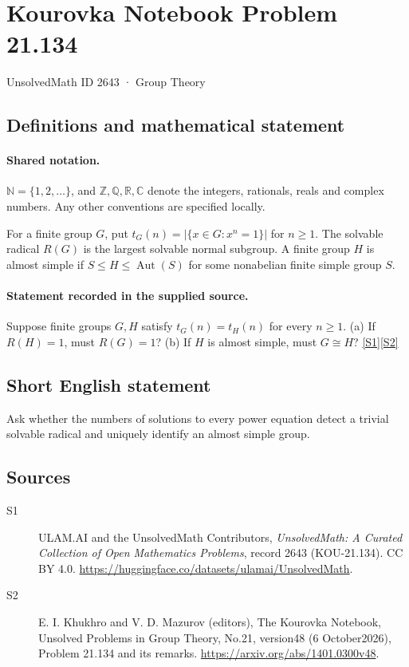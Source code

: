 \documentclass[11pt]{article}
\newcommand{\sref}[2]{\hyperlink{source:#1:#2}{[S#2]}}
\begin{document}
\setcounter{section}{2642}
\section{Kourovka Notebook Problem 21.134}\label{2643}
{\small\sffamily UnsolvedMath ID 2643 · Group Theory}
\subsection{Definitions and mathematical statement}

\paragraph{Shared notation.}$\mathbb N=\{1,2,\ldots\}$, and $\mathbb Z,\mathbb Q,\mathbb R,\mathbb C$ denote the integers, rationals, reals and complex numbers. Any other conventions are specified locally.


For a finite group $G$, put $t_G(n)=|\{x\in G:x^n=1\}|$ for $n\geq1$. The solvable radical $R(G)$ is the largest solvable normal subgroup. A finite group $H$ is almost simple if $S\leq H\leq\operatorname{Aut}(S)$ for some nonabelian finite simple group $S$.
\paragraph{Statement recorded in the supplied source.}
Suppose finite groups $G,H$ satisfy $t_G(n)=t_H(n)$ for every $n\geq1$. (a) If $R(H)=1$, must $R(G)=1$? (b) If $H$ is almost simple, must $G\cong H$? \sref{2643}{1}\sref{2643}{2}
\subsection{Short English statement}
Ask whether the numbers of solutions to every power equation detect a trivial solvable radical and uniquely identify an almost simple group.
\subsection{Sources}
\begin{description}
\item[\hypertarget{source:2643:1}{S1}] ULAM.AI and the UnsolvedMath Contributors, \emph{UnsolvedMath: A Curated Collection of Open Mathematics Problems}, record 2643 (KOU-21.134). CC BY 4.0. \url{https://huggingface.co/datasets/ulamai/UnsolvedMath}.
\item[\hypertarget{source:2643:2}{S2}] E. I. Khukhro and V. D. Mazurov (editors), The Kourovka Notebook, Unsolved Problems in Group Theory, No.21, version48 (6 October2026), Problem 21.134 and its remarks. \url{https://arxiv.org/abs/1401.0300v48}.
\end{description}
\label{end:2643}
\end{document}
